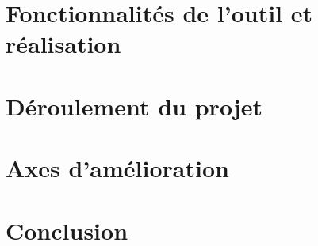 \documentclass{article}
\begin{document}


\clearpage
\newpage

\section{Fonctionnalités de l'outil et réalisation}
\bigbreak



\newpage

\section{Déroulement du projet}
\bigbreak 
\bigbreak



\newpage
\section{Axes d'amélioration}
\bigbreak

\bigbreak

\newpage
\section{Conclusion}
\bigbreak
\bigbreak



\newpage
\nocite{*}


\end{document}
